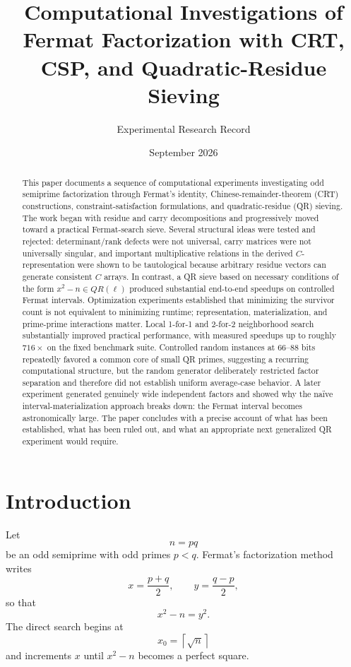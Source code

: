 \documentclass[11pt,a4paper]{article}
\title{Computational Investigations of Fermat Factorization with CRT, CSP, and Quadratic-Residue Sieving}
\author{Experimental Research Record}
\date{September 2026}
\begin{document}
\maketitle

\begin{abstract}
This paper documents a sequence of computational experiments investigating odd semiprime factorization through Fermat's identity, Chinese-remainder-theorem (CRT) constructions, constraint-satisfaction formulations, and quadratic-residue (QR) sieving. The work began with residue and carry decompositions and progressively moved toward a practical Fermat-search sieve. Several structural ideas were tested and rejected: determinant/rank defects were not universal, carry matrices were not universally singular, and important multiplicative relations in the derived $C$-representation were shown to be tautological because arbitrary residue vectors can generate consistent $C$ arrays. In contrast, a QR sieve based on necessary conditions of the form $x^2-n\in QR(\ell)$ produced substantial end-to-end speedups on controlled Fermat intervals. Optimization experiments established that minimizing the survivor count is not equivalent to minimizing runtime; representation, materialization, and prime-prime interactions matter. Local 1-for-1 and 2-for-2 neighborhood search substantially improved practical performance, with measured speedups up to roughly $716\times$ on the fixed benchmark suite. Controlled random instances at 66--88 bits repeatedly favored a common core of small QR primes, suggesting a recurring computational structure, but the random generator deliberately restricted factor separation and therefore did not establish uniform average-case behavior. A later experiment generated genuinely wide independent factors and showed why the naïve interval-materialization approach breaks down: the Fermat interval becomes astronomically large. The paper concludes with a precise account of what has been established, what has been ruled out, and what an appropriate next generalized QR experiment would require.
\end{abstract}

\section{Introduction}

Let
\[
 n=pq
\]
be an odd semiprime with odd primes $p<q$. Fermat's factorization method writes
\[
 x=\frac{p+q}{2},
 \qquad
 y=\frac{q-p}{2},
\]
so that
\begin{equation}
 x^2-n=y^2.
\label{eq:fermat}
\end{equation}
The direct search begins at
\[
 x_0=\left\lceil\sqrt n\right\rceil
\]
and increments $x$ until $x^2-n$ becomes a perfect square.
\end{document}
